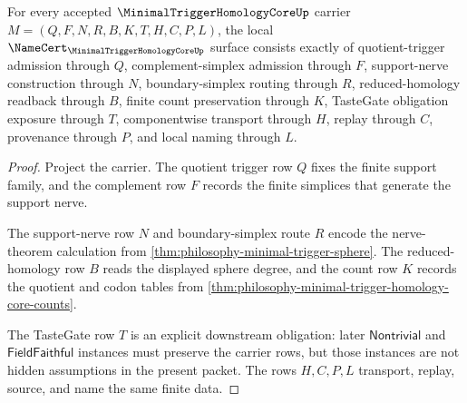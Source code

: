 \begin{theorem}
\label{thm:minimal-trigger-homology-core-namecert-obligations}
For every accepted $\MinimalTriggerHomologyCoreUp$ carrier $M=(Q,F,N,R,B,K,T,H,C,P,L)$, the local $\NameCert_{\MinimalTriggerHomologyCoreUp}$ surface consists exactly of quotient-trigger admission through $Q$, complement-simplex admission through $F$, support-nerve construction through $N$, boundary-simplex routing through $R$, reduced-homology readback through $B$, finite count preservation through $K$, TasteGate obligation exposure through $T$, componentwise transport through $H$, replay through $C$, provenance through $P$, and local naming through $L$.
\end{theorem}
\begin{proof}
Project the carrier. The quotient trigger row $Q$ fixes the finite support family, and the complement row $F$ records the finite simplices that generate the support nerve.

The support-nerve row $N$ and boundary-simplex route $R$ encode the nerve-theorem calculation from \autoref{thm:philosophy-minimal-trigger-sphere}. The reduced-homology row $B$ reads the displayed sphere degree, and the count row $K$ records the quotient and codon tables from \autoref{thm:philosophy-minimal-trigger-homology-core-counts}.

The TasteGate row $T$ is an explicit downstream obligation: later $\mathsf{Nontrivial}$ and $\mathsf{FieldFaithful}$ instances must preserve the carrier rows, but those instances are not hidden assumptions in the present packet. The rows $H,C,P,L$ transport, replay, source, and name the same finite data.
\end{proof}

